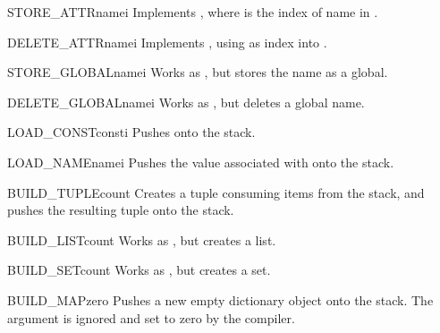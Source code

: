 \begin{opcodedesc}{STORE_ATTR}{namei}
Implements , where  is the index
of name in .
\end{opcodedesc}

\begin{opcodedesc}{DELETE_ATTR}{namei}
Implements , using  as index into
.
\end{opcodedesc}

\begin{opcodedesc}{STORE_GLOBAL}{namei}
Works as , but stores the name as a global.
\end{opcodedesc}

\begin{opcodedesc}{DELETE_GLOBAL}{namei}
Works as , but deletes a global name.
\end{opcodedesc}


\begin{opcodedesc}{LOAD_CONST}{consti}
Pushes  onto the stack.
\end{opcodedesc}

\begin{opcodedesc}{LOAD_NAME}{namei}
Pushes the value associated with  onto the stack.
\end{opcodedesc}

\begin{opcodedesc}{BUILD_TUPLE}{count}
Creates a tuple consuming  items from the stack, and pushes
the resulting tuple onto the stack.
\end{opcodedesc}

\begin{opcodedesc}{BUILD_LIST}{count}
Works as , but creates a list.
\end{opcodedesc}

\begin{opcodedesc}{BUILD_SET}{count}
Works as , but creates a set.
\end{opcodedesc}

\begin{opcodedesc}{BUILD_MAP}{zero}
Pushes a new empty dictionary object onto the stack.  The argument is
ignored and set to zero by the compiler.
\end{opcodedesc}

